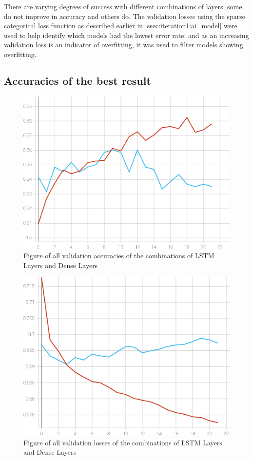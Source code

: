 There are varying degrees of success with different combinations of layers; some do not improve in accuracy and others do.
The validation losses using the sparse categorical loss function as described earlier in \autoref{ssec:iteration1:ai_model}
were used to help identify which models had the lowest error rate; and as an increasing validation
loss is an indicator of overfitting, it was used to filter models showing overfitting.

\subsection{Accuracies of the best result}
\begin{figure}[ht]
    \centering
    \includegraphics[width=0.95\columnwidth]{figures/results/cnn_iteration2_1c32_1d32_accuracy.eps}
    \caption[Figure of accuracies and losses for Iteration 2]{Figure of all validation accuracies of the combinations of LSTM Layers and Dense Layers}
    \label{fig:iteration2_best_accuracy}
\end{figure}
\FloatBarrier
\begin{figure}[ht]
    \centering
    \includegraphics[width=0.95\columnwidth]{figures/results/cnn_iteration2_1c32_1d32_loss.eps}
    \caption[Figure of accuracies and losses for Iteration 2]{Figure of all validation losses of the combinations of LSTM Layers and Dense Layers}
    \label{fig:iteration2_best_loss}
\end{figure}
\FloatBarrier


